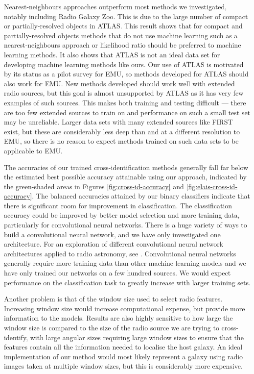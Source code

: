   Nearest-neighbours approaches outperform most methods we investigated,
  notably including Radio Galaxy Zoo. This is due to the large number of
  compact or partially-resolved objects in ATLAS. This result shows that for
  compact and partially-resolved objects methods that do not use machine
  learning such as a nearest-neighbours approach or likelihood ratio
  \citep{weston18lrpy} should be preferred to machine learning methods. It
  also shows that ATLAS is not an ideal data set for developing machine
  learning methods like ours. Our use of ATLAS is motivated by its status as a
  pilot survey for EMU, so methods developed for ATLAS should also work for
  EMU. New methods developed should work well with extended radio sources, but
  this goal is almost unsupported by ATLAS as it has very few examples of such
  sources. This makes both training and testing difficult --- there are too
  few extended sources to train on and performance on such a small test set
  may be unreliable. Larger data sets with many extended sources like FIRST
  exist, but these are considerably less deep than and at a different
  resolution to EMU, so there is no reason to expect methods trained on such
  data sets to be applicable to EMU.

  The accuracies of our trained cross-identification methods generally fall
  far below the estimated best possible accuracy attainable using our approach,
  indicated by the green-shaded areas in Figures \ref{fig:cross-id-accuracy} and
  \ref{fig:elais-cross-id-accuracy}. The balanced accuracies attained by our
  binary classifiers indicate that there is significant room for improvement
  in classification. The classification accuracy could be improved by better
  model selection and more training data, particularly for convolutional
  neural networks. There is a huge variety of ways to build a convolutional
  neural network, and we have only investigated one architecture. For an
  exploration of different convolutional neural network architectures applied
  to radio astronomy, see \citet{lukic18compact}. Convolutional neural
  networks generally require more training data than other machine learning
  models and we have only trained our networks on a few hundred sources. We
  would expect performance on the classification task to greatly increase
  with larger training sets.

  Another problem is that of the window size used to select radio features.
  Increasing window size would increase computational expense, but provide
  more information to the models. Results are also highly sensitive to how
  large the window size is compared to the size of the radio source we are
  trying to cross-identify, with large angular sizes requiring large window
  sizes to ensure that the features contain all the information needed to
  localise the host galaxy. An ideal implementation of our method would most
  likely represent a galaxy using radio images taken at multiple window
  sizes, but this is considerably more expensive.

